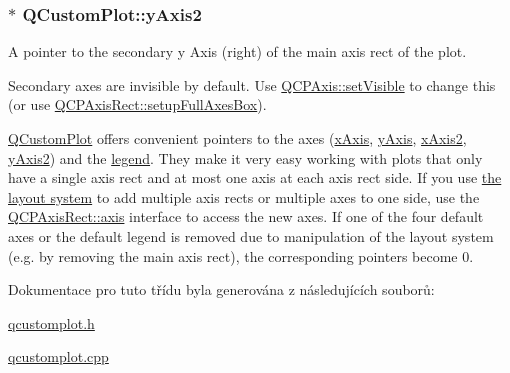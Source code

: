 \subsubsection[{y\+Axis2}]{ $\ast$ Q\+Custom\+Plot\+::y\+Axis2}\label{classQCustomPlot_af13fdc5bce7d0fabd640f13ba805c0b7}


A pointer to the secondary y Axis (right) of the main axis rect of the plot. 

Secondary axes are invisible by default. Use \hyperlink{classQCPLayerable_a3bed99ddc396b48ce3ebfdc0418744f8}{Q\+C\+P\+Axis\+::set\+Visible} to change this (or use \hyperlink{classQCPAxisRect_a5fa906175447b14206954f77fc7f1ef4}{Q\+C\+P\+Axis\+Rect\+::setup\+Full\+Axes\+Box}).

\hyperlink{classQCustomPlot}{Q\+Custom\+Plot} offers convenient pointers to the axes (\hyperlink{classQCustomPlot_a9a79cd0158a4c7f30cbc702f0fd800e4}{x\+Axis}, \hyperlink{classQCustomPlot_af6fea5679725b152c14facd920b19367}{y\+Axis}, \hyperlink{classQCustomPlot_ada41599f22cad901c030f3dcbdd82fd9}{x\+Axis2}, \hyperlink{classQCustomPlot_af13fdc5bce7d0fabd640f13ba805c0b7}{y\+Axis2}) and the \hyperlink{classQCustomPlot_a4eadcd237dc6a09938b68b16877fa6af}{legend}. They make it very easy working with plots that only have a single axis rect and at most one axis at each axis rect side. If you use \hyperlink{}{the layout system} to add multiple axis rects or multiple axes to one side, use the \hyperlink{classQCPAxisRect_a560de44e47a4af0f86c59102a094b1e4}{Q\+C\+P\+Axis\+Rect\+::axis} interface to access the new axes. If one of the four default axes or the default legend is removed due to manipulation of the layout system (e.\+g. by removing the main axis rect), the corresponding pointers become 0. 

Dokumentace pro tuto třídu byla generována z následujících souborů\+:\begin{DoxyCompactItemize}
\item 
\hyperlink{qcustomplot_8h}{qcustomplot.\+h}\item 
\hyperlink{qcustomplot_8cpp}{qcustomplot.\+cpp}\end{DoxyCompactItemize}
